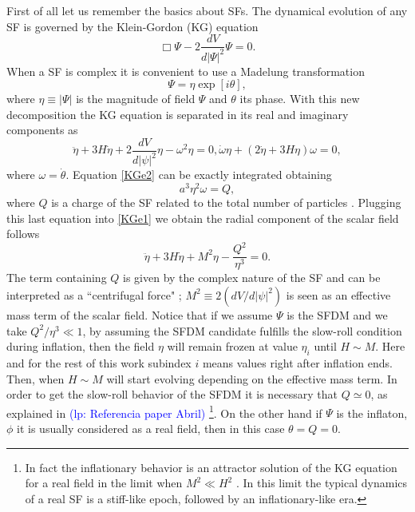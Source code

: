 \documentclass[amssymb,twocolumn,prd,nofootinbib,showpacs]{revtex4-1}
\newcommand{\lp}[1]{\textcolor{blue}{(lp: #1)}}
\begin{document}
First of all let us remember the basics about SFs. 
The dynamical evolution of any SF is governed by the Klein-Gordon (KG) equation
\begin{equation}
\Box\Psi-2\frac{dV}{d|\Psi|^2}\Psi=0.
\end{equation}
When a SF is complex it is convenient to use a Madelung transformation \cite{madelung}
\begin{equation}
\Psi = \eta \exp[i\theta],
\end{equation}
%
where $\eta\equiv |\Psi|$ is the magnitude of field $\Psi$ and $\theta$ its phase. With this new decomposition the 
KG equation is separated in its real and imaginary components as
%
\begin{subequations}\label{KESFDM}
\begin{equation}\label{KGe1}
\ddot\eta+3H\dot\eta+2\frac{dV}{d|\psi|^2}\eta-\omega^2\eta= 0,
\end{equation}
\begin{equation}\label{KGe2}
\dot\omega \eta + (2\dot\eta+3H\eta)\omega=0,
\end{equation}
\end{subequations}
%
where $\omega = \dot \theta$. Equation \eqref{KGe2} can be exactly integrated obtaining 
%
\begin{equation}
a^3\eta^2\omega=Q,
\end{equation}
%
where $Q$ is a charge of the SF related to the total number of particles 
\cite{SFphi42,charge1,SFphi41,charge3,charge4}. Plugging this last equation into \eqref{KGe1} we obtain
the radial component of the scalar field follows
%
\begin{equation}\label{KGe3}
\ddot\eta+3H\dot\eta+M^2\eta-\frac{Q^2}{\eta^3}= 0.
\end{equation}
%
The term containing $Q$ is given by the complex nature of the SF \cite{SFphi42} and can be interpreted 
as a ``centrifugal force" \cite{charge4}; $M^2\equiv 2(dV/d|\psi|^2)$ is seen as an effective mass term 
of the scalar field. Notice that if we assume $\Psi$ is the SFDM and we take $Q^2/\eta^3\ll 1$, 
by assuming the SFDM candidate fulfills the slow-roll condition during inflation, 
then the field $\eta$ will remain frozen at value $\eta_i$ until $H\sim M$. Here and for the rest of this 
work subindex $i$ means values right after inflation ends. Then, when $H\sim M$ will start 
evolving depending on the effective mass term. In order to get the slow-roll behavior of the SFDM it is 
necessary that $Q\simeq 0$, as explained in \lp{Referencia paper Abril}
\footnote{In fact the inflationary behavior is an attractor solution of the KG equation for a real field in the limit when $M^2\ll H^2$ \cite{atractorinf1,atractorinf2}.
 In this limit the typical dynamics of a real SF is a stiff-like epoch, followed by an inflationary-like era. }. 
 On the other hand if $\Psi$ is the inflaton, $\phi$ it is usually considered as a real field, then in this case $\theta=Q=0$.
 
\end{document}
